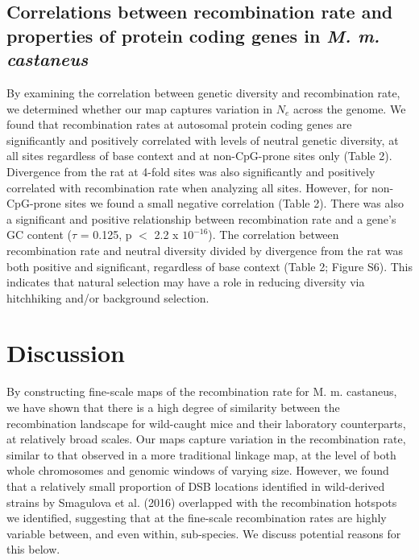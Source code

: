 \subsection{Correlations between recombination rate and properties of protein coding genes in \emph{M. m. castaneus}}

	By examining the correlation between genetic diversity and recombination rate, we determined whether our map captures variation in $N_e$ across the genome. We found that recombination rates at autosomal protein coding genes are significantly and positively correlated with levels of neutral genetic diversity, at all sites regardless of base context and at non-CpG-prone sites only (Table 2). Divergence from the rat at 4-fold sites was also significantly and positively correlated with recombination rate when analyzing all sites. However, for non-CpG-prone sites we found a small negative correlation (Table 2). There was also a significant and positive relationship between recombination rate and a gene’s GC content ($\tau$ = 0.125, p $<$ 2.2 x $10^{-16}$). The correlation between recombination rate and neutral diversity divided by divergence from the rat was both positive and significant, regardless of base context (Table 2; Figure S6). This indicates that natural selection may have a role in reducing diversity via hitchhiking and/or background selection.
\linespread{1}

\linespread{2}



\section{Discussion}
 
        	By constructing fine-scale maps of the recombination rate for M. m. castaneus, we have shown that there is a high degree of similarity between the recombination landscape for wild-caught mice and their laboratory counterparts, at relatively broad scales. Our maps capture variation in the recombination rate, similar to that observed in a more traditional linkage map, at the level of both whole chromosomes and genomic windows of varying size. However, we found that a relatively small proportion of DSB locations identified in wild-derived strains by Smagulova et al. (2016) overlapped with the recombination hotspots we identified, suggesting that at the fine-scale recombination rates are highly variable between, and even within, sub-species. We discuss potential reasons for this below.
 
